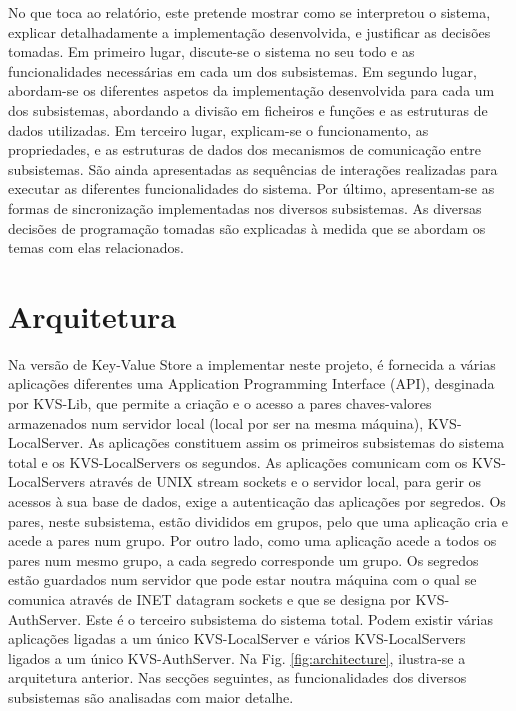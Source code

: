No que toca ao relatório, este pretende mostrar como se interpretou o sistema, explicar detalhadamente a implementação desenvolvida, e justificar as decisões tomadas. Em primeiro lugar, discute-se o sistema no seu todo e as funcionalidades necessárias em cada um dos subsistemas. Em segundo lugar, abordam-se os diferentes aspetos da implementação desenvolvida para cada um dos subsistemas, abordando a divisão em ficheiros e funções e as estruturas de dados utilizadas. Em terceiro lugar, explicam-se o funcionamento, as propriedades, e as estruturas de dados dos mecanismos de comunicação entre subsistemas. São ainda apresentadas as sequências de interações realizadas para executar as diferentes funcionalidades do sistema. Por último, apresentam-se as formas de sincronização implementadas nos diversos subsistemas. As diversas decisões de programação tomadas são explicadas à medida que se abordam os temas com elas relacionados.

\section{Arquitetura}\label{sec:Arq}


Na versão de Key-Value Store a implementar neste projeto, é fornecida a várias aplicações diferentes uma Application Programming Interface (API), desginada por KVS-Lib, que permite a criação e o acesso a pares chaves-valores armazenados num servidor local (local por ser na mesma máquina), KVS-LocalServer. As aplicações constituem assim os primeiros subsistemas do sistema total e os KVS-LocalServers os segundos. As aplicações comunicam com os KVS-LocalServers através de UNIX stream sockets e o servidor local, para gerir os acessos à sua base de dados, exige a autenticação das aplicações por segredos. Os pares, neste subsistema, estão divididos em grupos, pelo que uma aplicação cria e acede a pares num grupo. Por outro lado, como uma aplicação acede a todos os pares num mesmo grupo, a cada segredo corresponde um grupo. Os segredos estão guardados num servidor que pode estar noutra máquina com o qual se comunica através de INET datagram sockets e que se designa por KVS-AuthServer. Este é o terceiro subsistema do sistema total. Podem existir várias aplicações ligadas a um único KVS-LocalServer e vários KVS-LocalServers ligados a um único KVS-AuthServer. Na Fig. \ref{fig:architecture}, ilustra-se a arquitetura anterior. Nas secções seguintes, as funcionalidades dos diversos subsistemas são analisadas com maior detalhe.

